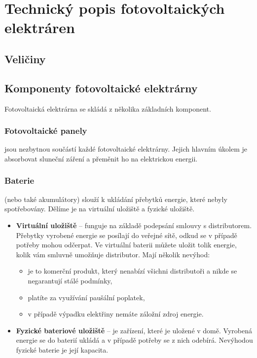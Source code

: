 \section{Technický popis fotovoltaických elektráren}

\subsection{Veličiny}

\subsection{Komponenty fotovoltaické elektrárny}
Fotovoltaická elektrárna se skládá z několika základních komponent.

\subsubsection{Fotovoltaické panely}

jsou nezbytnou součástí každé fotovoltaické elektrárny.
Jejich hlavním úkolem je absorbovat sluneční záření a přeměnit ho na elektrickou energii.

\subsubsection{Baterie}

(nebo také akumulátory) slouží k ukládání přebytků energie, které nebyly spotřebovány.
Dělíme je na virtuální uložiště a fyzické uložiště.

\begin{itemize}
    \item \textbf{Virtuální uložiště} -- funguje na základě podepsání smlouvy s distributorem. Přebytky vyrobené energie se posílají do veřejné sítě, odkud se v případě potřeby mohou odčerpat.  Ve virtuální baterii můžete uložit tolik energie, kolik vám smluvně umožňuje distributor. Mají několik nevýhod:
    \begin{itemize}
        \item je to komerční produkt, který nenabízí všichni distributoři a nikde se negarantují stálé podmínky,
        \item platíte za využívání paušální poplatek,
        \item v případě výpadku elektřiny nemáte záložní zdroj energie.
    \end{itemize}
    \item \textbf{Fyzické bateriové uložiště} -- je zařízení, které je uložené v domě. Vyrobená energie se do baterií ukládá a v případě potřeby se z nich odebírá. Nevýhodou fyzické baterie je její kapacita.
\end{itemize}


